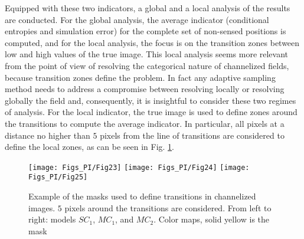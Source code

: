 Equipped with these two indicators, a global and a local analysis of the results are conducted. For the global analysis, the average indicator (conditional entropies and simulation error) for the complete set of non-sensed positions is computed, and for the local analysis, the focus is on the transition zones between low and high values of the true image. This local analysis seems more relevant from the point of view of resolving the categorical nature of channelized fields,  because transition zones define the problem. In fact any adaptive sampling method needs to address a compromise between resolving locally or resolving globally the field and, consequently,  it is insightful to consider these two regimes of analysis. For the local indicator,  the true image is used to define zones around the transitions to compute the average indicator. In particular, all pixels at a distance no higher than $5$ pixels from the line of transitions are considered to define the local zones, as can be seen in Fig. \ref{fig:ExampleMasks_PI}.

\begin{figure}[!ht]
    \centering
    \texttt{[image: Figs\_PI/Fig23]}
    \texttt{[image: Figs\_PI/Fig24]}
    \texttt{[image: Figs\_PI/Fig25]}
	\caption[Example of the masks used to define transitions in channelized images.]{\label{fig:ExampleMasks_PI} Example of the masks used to define transitions in channelized images. $5$ pixels around the transitions are considered. From left to right: models $SC_1$, $MC_1$, and $MC_2$. Color maps, solid yellow is the mask}
\end{figure}

